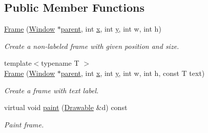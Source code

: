 \subsection*{Public Member Functions}
\begin{DoxyCompactItemize}
\item 
\hypertarget{classGUI_1_1Frame_a6e6473b283cab944efdbcdf9b4c88957}{\hyperlink{classGUI_1_1Frame_a6e6473b283cab944efdbcdf9b4c88957}{Frame} (\hyperlink{classGUI_1_1Window}{Window} $\ast$\hyperlink{classGUI_1_1Window_a2e593ff65e7702178d82fe9010a0b539}{parent}, int \hyperlink{classGUI_1_1Window_a6ca6a80ca00c9e1d8ceea8d3d99a657d}{x}, int \hyperlink{classGUI_1_1Window_a0ee8e923aff2c3661fc2e17656d37adf}{y}, int w, int h)}\label{classGUI_1_1Frame_a6e6473b283cab944efdbcdf9b4c88957}

\begin{DoxyCompactList}\small\item\em Create a non-\/labeled frame with given position and size. \end{DoxyCompactList}\item 
\hypertarget{classGUI_1_1Frame_a7d181489b0aa94eda947cd0600a17980}{{\footnotesize template$<$typename T $>$ }\\\hyperlink{classGUI_1_1Frame_a7d181489b0aa94eda947cd0600a17980}{Frame} (\hyperlink{classGUI_1_1Window}{Window} $\ast$\hyperlink{classGUI_1_1Window_a2e593ff65e7702178d82fe9010a0b539}{parent}, int \hyperlink{classGUI_1_1Window_a6ca6a80ca00c9e1d8ceea8d3d99a657d}{x}, int \hyperlink{classGUI_1_1Window_a0ee8e923aff2c3661fc2e17656d37adf}{y}, int w, int h, const T text)}\label{classGUI_1_1Frame_a7d181489b0aa94eda947cd0600a17980}

\begin{DoxyCompactList}\small\item\em Create a frame with text label. \end{DoxyCompactList}\item 
\hypertarget{classGUI_1_1Frame_ad817026ad35127e47828a5d4ce0f7626}{virtual void \hyperlink{classGUI_1_1Frame_ad817026ad35127e47828a5d4ce0f7626}{paint} (\hyperlink{classGUI_1_1Drawable}{Drawable} \&d) const }\label{classGUI_1_1Frame_ad817026ad35127e47828a5d4ce0f7626}

\begin{DoxyCompactList}\small\item\em Paint frame. \end{DoxyCompactList}\end{DoxyCompactItemize}
